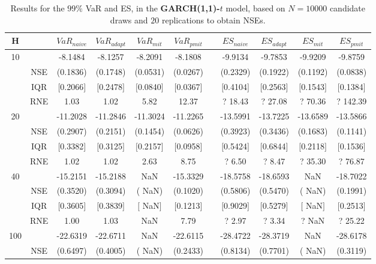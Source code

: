 \footnotesize{  
{ \renewcommand{\arraystretch}{1.3} 
\begin{longtable}{ccccccccccc}  
\caption{Results for the $99\%$ VaR and ES, in the \textbf{GARCH(1,1)-$t$} model, based on $N=10000$ candidate draws and $20$ replications to obtain NSEs.} 
\label{tab:res_algos_t_garch2_noS} \\ 
 H & & $VaR_{naive}$ & $VaR_{adapt}$ & $VaR_{mit}$  & $VaR_{pmit}$ &  & $ES_{naive}$ & $ES_{adapt}$ & $ES_{mit}$ & $ES_{pmit}$ \\ \hline 
10 & & -8.1484 & -8.1257 & -8.2091 & -8.1808 & & -9.9134 & -9.7853 & -9.9209 & -9.8759  \\ 
  & NSE & (0.1836) & (0.1748) & (0.0531) & (0.0267) & & (0.2329) & (0.1922) & (0.1192) & (0.0838)   \\ 
 & IQR & $[$0.2066$]$ & $[$0.2478$]$ & $[$0.0840$]$ & $[$0.0367$]$ & & $[$0.4104$]$ & $[$0.2563$]$  &$[$0.1543$]$ & $[$0.1384$]$  \\  
  & RNE &   1.03 &   1.02 &   5.82 &  12.37 &  &?  18.43 & ?  27.08 &  ?  70.36 & ? 142.39   \\ [1ex] 
20 & & -11.2028 & -11.2846 & -11.3024 & -11.2265 & & -13.5991 & -13.7225 & -13.6589 & -13.5866  \\ 
  & NSE & (0.2907) & (0.2151) & (0.1454) & (0.0626) & & (0.3923) & (0.3436) & (0.1683) & (0.1141)   \\ 
 & IQR & $[$0.3382$]$ & $[$0.3125$]$ & $[$0.2157$]$ & $[$0.0958$]$ & & $[$0.5424$]$ & $[$0.6844$]$  &$[$0.2118$]$ & $[$0.1536$]$  \\  
  & RNE &   1.02 &   1.02 &   2.63 &   8.75 &  &?   6.50 & ?   8.47 &  ?  35.30 & ?  76.87   \\ [1ex] 
40 & & -15.2151 & -15.2188 &    NaN & -15.3329 & & -18.5758 & -18.6593 &    NaN & -18.7022  \\ 
  & NSE & (0.3520) & (0.3094) & (   NaN) & (0.1020) & & (0.5806) & (0.5470) & (   NaN) & (0.1991)   \\ 
 & IQR & $[$0.3605$]$ & $[$0.3839$]$ & $[$   NaN$]$ & $[$0.1213$]$ & & $[$0.9029$]$ & $[$0.5279$]$  &$[$   NaN$]$ & $[$0.2513$]$  \\  
  & RNE &   1.00 &   1.03 &    NaN &   7.79 &  &?   2.97 & ?   3.34 &  ?    NaN & ?  25.22   \\ [1ex] 
100 & & -22.6319 & -22.6711 &    NaN & -22.6115 & & -28.4722 & -28.3719 &    NaN & -28.6178  \\ 
  & NSE & (0.6497) & (0.4005) & (   NaN) & (0.2433) & & (0.8134) & (0.7701) & (   NaN) & (0.3119)   \\ 

\end{longtable}}}
